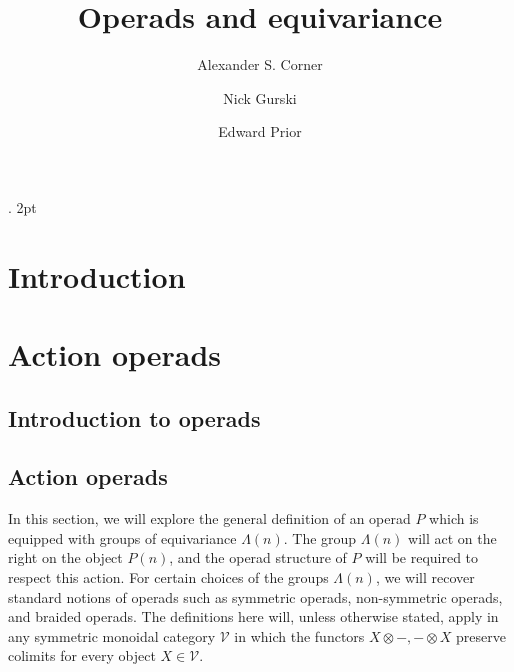 \documentclass{amsbook} %
\numberwithin{section}{chapter}
\begin{document}
\newtheorem{thm}{Theorem}[section]
\newtheorem{prop}[thm]{Proposition}
\newtheorem{lem}[thm]{Lemma}
\newtheorem{cor}[thm]{Corollary}

%
     {}%
     {}%
     {\bfseries}%
     {.}%
     {2pt}%
     {}%
		
		

   \theoremstyle{example}
	\newtheorem{conv}[thm]{Conventions}
   \newtheorem{nota}[thm]{Notation}
   \newtheorem{example}[thm]{Example}
	\newtheorem{Defi}[thm]{Definition}
   \newtheorem{rem}[thm]{Remark}

   \title[Operads]{Operads and equivariance}

\author{Alexander S. Corner}
\address{}
\author{Nick Gurski}
\address{}
\author{Edward Prior}
\address{}
\email{}
\keywords{}
\subjclass{}

\maketitle

\tableofcontents


\chapter{Introduction}




\chapter{Action operads}
 \section{Introduction to operads}
 
 \section{Action operads}
 In this section, we will explore the general definition of an operad $P$ which is equipped with groups of equivariance $\Lambda(n)$.  The group $\Lambda(n)$ will act on the right on the object $P(n)$, and the operad structure of $P$ will be required to respect this action.  For certain choices of the groups $\Lambda(n)$, we will recover standard notions of operads such as symmetric operads, non-symmetric operads, and braided operads.  The definitions here will, unless otherwise stated, apply in any symmetric monoidal category $\mathcal{V}$ in which the functors $X \otimes -, - \otimes X$ preserve colimits for every object $X \in \mathcal{V}$.
\end{document}
